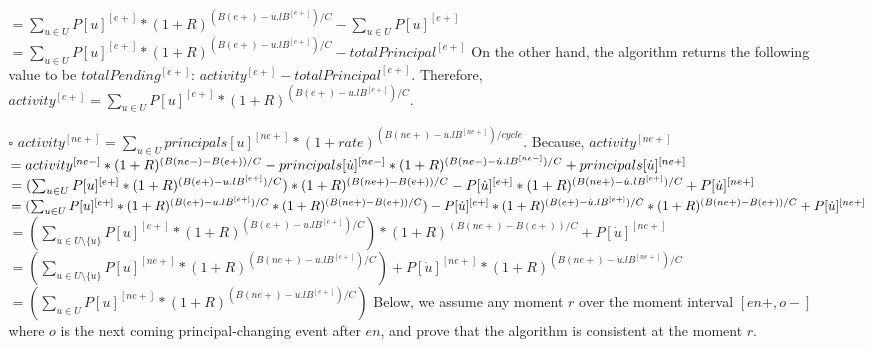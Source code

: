 \documentclass{article}
\begin{document}
\begin{itemize}
\begin{itemize}
    $ = \sum_{u \in U} P[u]^{[e+]} * (1+R )^{(B(e+)-u.lB^{[e+]})/C}
    - \sum_{u \in U} P[u]^{[e+]} $
    \newline \newline
    $ = \sum_{u \in U} P[u]^{[e+]} * (1+R )^{(B(e+)-u.lB^{[e+]})/C} - totalPrincipal^{[e+]} $
    \newline \newline
    On the other hand, the algorithm returns the following value to be $ totalPending^{[e+]} $:
    \newline \newline
    $ activity^{[e+]} - totalPrincipal^{[e+]} $.
    \newline \newline
    Therefore, $ activity^{[e+]} = \sum_{u \in U} P[u]^{[e+]} * (1+R )^{(B(e+)-u.lB^{[e+]})/C}$.
    \newline
  
    \item[$\square$] $ activity^{[ne+]} = \sum_{u \in U} principals[u]^{[ne+]} * (1+rate )^{(B(ne+)-u.lB^{[ne+]})/cycle}$.
    \newline \newline
    Because, $ activity^{[ne+]}$
    \newline \newline
    $ = activity^{[ne-]} * (1+R)^{(B(ne-)-B(e+))/C} \\
    - principals[\dot u]^{[ne-]} * (1+R)^{(B(ne-)-{\dot u}.lB^{[ne-]})/C} + principals[\dot u]^{[ne+]} $
    \newline \newline
    $ = (\sum_{u \in U} P[u]^{[e+]} * (1+R)^{(B(e+)-u.lB^{[e+]})/C}) * (1+R)^{(B(ne+)-B(e+))/C} \\
    - P[\dot u]^{[e+]} * (1+R)^{(B(ne+)-{\dot u}.lB^{[e+]})/C} + P[\dot u]^{[ne+]} $
    \newline \newline
    $ = (\sum_{u \in U} P[u]^{[e+]} * (1+R)^{(B(e+)-u.lB^{[e+]})/C} * (1+R)^{(B(ne+)-B(e+))/C}) \\
    - P[\dot u]^{[e+]} * (1+R)^{(B(e+)-{\dot u}.lB^{[e+]})/C} * (1+R)^{(B(ne+)-B(e+))/C}
    + P[\dot u]^{[ne+]} $
    \newline \newline
    $ = (\sum_{u \in U \setminus \{\dot u\}} P[u]^{[e+]} * (1+R)^{(B(e+)-u.lB^{[e+]})/C}) * (1+R)^{(B(ne+)-B(e+))/C}
    + P[\dot u]^{[ne+]} $
    \newline \newline
    $ = (\sum_{u \in U \setminus \{\dot u\}} P[u]^{[ne+]} * (1+R)^{(B(ne+)-u.lB^{[e+]})/C})
    + P[\dot u]^{[ne+]} * (1+R) ^ {(B(ne+)-{\dot u}.lB^{[ne+]})/C} $
    \newline \newline
    $ = (\sum_{u \in U} P[u]^{[ne+]} * (1+R)^{(B(ne+)-u.lB^{[e+]})/C})$
    \newline \newline
    Below, we assume any moment $r$ over the moment interval $[en+, o-]$ where $o$ is the next 
    coming principal-changing event after $en$, and prove that the algorithm is 
    consistent at the moment $r$.


\end{itemize}
\end{itemize}
\end{document}
